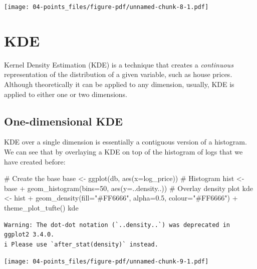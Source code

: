 \documentclass[
  letterpaper,
  DIV=11,
  numbers=noendperiod,
  oneside]{scrreprt}
\newenvironment{Shaded}{\begin{snugshade}}{\end{snugshade}}
\newcommand{\AttributeTok}[1]{\textcolor[rgb]{0.40,0.45,0.13}{#1}}
\newcommand{\CommentTok}[1]{\textcolor[rgb]{0.37,0.37,0.37}{#1}}
\newcommand{\DecValTok}[1]{\textcolor[rgb]{0.68,0.00,0.00}{#1}}
\newcommand{\FloatTok}[1]{\textcolor[rgb]{0.68,0.00,0.00}{#1}}
\newcommand{\FunctionTok}[1]{\textcolor[rgb]{0.28,0.35,0.67}{#1}}
\newcommand{\NormalTok}[1]{\textcolor[rgb]{0.00,0.23,0.31}{#1}}
\newcommand{\OtherTok}[1]{\textcolor[rgb]{0.00,0.23,0.31}{#1}}
\newcommand{\SpecialCharTok}[1]{\textcolor[rgb]{0.37,0.37,0.37}{#1}}
\newcommand{\StringTok}[1]{\textcolor[rgb]{0.13,0.47,0.30}{#1}}
\begin{document}
\texttt{[image: 04-points\_files/figure-pdf/unnamed-chunk-8-1.pdf]}

\section{KDE}\label{kde}

Kernel Density Estimation (KDE) is a technique that creates a
\emph{continuous} representation of the distribution of a given
variable, such as house prices. Although theoretically it can be applied
to any dimension, usually, KDE is applied to either one or two
dimensions.

\subsection{One-dimensional KDE}\label{one-dimensional-kde}

KDE over a single dimension is essentially a contiguous version of a
histogram. We can see that by overlaying a KDE on top of the histogram
of logs that we have created before:

\begin{Shaded}
\begin{Highlighting}[]
\CommentTok{\# Create the base}
\NormalTok{base }\OtherTok{\textless{}{-}} \FunctionTok{ggplot}\NormalTok{(db, }\FunctionTok{aes}\NormalTok{(}\AttributeTok{x=}\NormalTok{log\_price))}
\CommentTok{\# Histogram}
\NormalTok{hist }\OtherTok{\textless{}{-}}\NormalTok{ base }\SpecialCharTok{+} 
  \FunctionTok{geom\_histogram}\NormalTok{(}\AttributeTok{bins=}\DecValTok{50}\NormalTok{, }\FunctionTok{aes}\NormalTok{(}\AttributeTok{y=}\NormalTok{..density..))}
\CommentTok{\# Overlay density plot}
\NormalTok{kde }\OtherTok{\textless{}{-}}\NormalTok{ hist }\SpecialCharTok{+} 
  \FunctionTok{geom\_density}\NormalTok{(}\AttributeTok{fill=}\StringTok{"\#FF6666"}\NormalTok{, }\AttributeTok{alpha=}\FloatTok{0.5}\NormalTok{, }\AttributeTok{colour=}\StringTok{"\#FF6666"}\NormalTok{) }\SpecialCharTok{+}
  \FunctionTok{theme\_plot\_tufte}\NormalTok{()}
\NormalTok{kde}
\end{Highlighting}
\end{Shaded}

\begin{verbatim}
Warning: The dot-dot notation (`..density..`) was deprecated in ggplot2 3.4.0.
i Please use `after_stat(density)` instead.
\end{verbatim}

\texttt{[image: 04-points\_files/figure-pdf/unnamed-chunk-9-1.pdf]}
\end{document}

